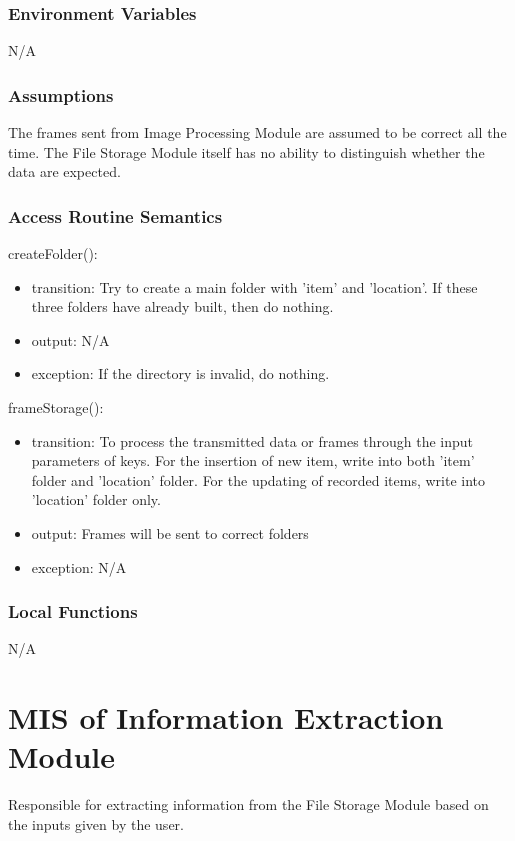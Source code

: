 \documentclass[12pt, titlepage]{article}
\begin{document}
\subsubsection{Environment Variables}
N/A
\subsubsection{Assumptions}
The frames sent from Image Processing Module are assumed to be correct all the time. The File Storage Module itself has no ability to distinguish whether the data are expected.

\subsubsection{Access Routine Semantics}

\noindent createFolder():
\begin{itemize} 
\item transition: Try to create a main folder with 'item' and 'location'. If these three folders have already built, then do nothing.
\item output: N/A
\item exception: If the directory is invalid, do nothing.
\end{itemize}
\noindent frameStorage():
\begin{itemize} 
\item transition: To process the transmitted data or frames through the input parameters of keys. For the insertion of new item, write into both 'item' folder and 'location' folder. For the updating of recorded items, write into 'location' folder only.
\item output: Frames will be sent to correct folders
\item exception: N/A
\end{itemize}

\subsubsection{Local Functions}

N/A

\newpage

\section{MIS of Information Extraction Module} 

Responsible for extracting information from the File Storage Module based on the inputs given by the user.
\end{document}
